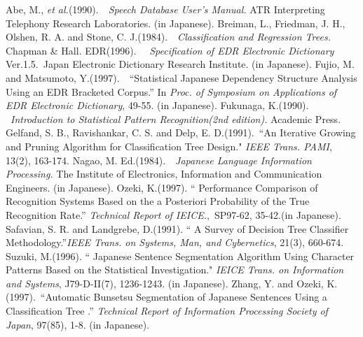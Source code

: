 \begin{thebibliography}{19}
 Abe, M.,  {\it et al.}(1990).\ \ {\it Speech Database User's Manual.}
 {\rm ATR Interpreting Telephony Research Laboratories}. (in
Japanese).
 Breiman, L., Friedman, J. H., Olshen, R. A. and Stone,
C. J.(1984).\ \ {\it Classification  and Regression Trees.} {\rm
Chapman \& Hall}.
 EDR(1996). \ \ {\it Specification of EDR Electronic Dictionary}
\,{\rm Ver.1.5.}\,
Japan Electronic Dictionary Research Institute. (in Japanese).
 Fujio, M. and Matsumoto, Y.(1997).\ \ ``Statistical
Japanese Dependency Structure Analysis Using an
EDR Bracketed Corpus.''
{\rm In} {\it Proc. of Symposium on Applications of EDR Electronic
Dictionary}, 49-55. (in Japanese).
 Fukunaga, K.(1990). \ {\it Introduction to Statistical Pattern
Recognition(2nd edition).}
{\rm Academic Press}. 
 Gelfand, S. B., Ravishankar, C. S. 
and Delp, E. D.(1991).\ ``An Iterative Growing and Pruning Algorithm
for Classification Tree Design." {\it IEEE Trans. PAMI}, 
13(2), 163-174.
 Nagao, M. Ed.(1984).\ \ {\it Japanese Language Information
Processing.} {\rm The Institute of Electronics, Information and
Communication Engineers}. (in Japanese).
 Ozeki, K.(1997). ``
Performance Comparison of Recognition Systems Based on the a
Posteriori Probability of the True Recognition Rate.''
{\it Technical Report of IEICE.},\ SP97-62, 35-42.(in
Japanese).
 Safavian, S. R. and Landgrebe, D.(1991). ``
A Survey of Decision Tree Classifier Methodology.''{\it IEEE Trans. on 
Systems, Man, and Cybernetics}, 21(3), 660-674.
 Suzuki, M.(1996). ``
Japanese Sentence Segmentation Algorithm Using Character Patterns
Based on the Statistical Investigation." 
{\it IEICE Trans. on Information and Systems},
J79-D-II(7), 1236-1243. (in Japanese).
 Zhang, Y. and Ozeki, K.(1997).\ ``Automatic Bunsetsu Segmentation of
Japanese Sentences Using a Classification Tree
.'' {\it Technical Report of Information Processing Society of Japan}, 
97(85), 1-8. (in Japanese).

\end{thebibliography}

